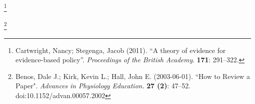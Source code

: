 \documentclass{article}
\begin{document}
    \pagestyle{fancy}
    \hspace{0pt}
    \vfill

    \begin{center}
    \end{center}

    \hspace{0pt}
    \vfill

    \begin{center}
	\footnote{Cartwright, Nancy; Stegenga, Jacob (2011). ``A theory of evidence for evidence-based policy''. {\it Proceedings of the British Academy}. {\bfseries 171}: 291--322.}
    \end{center}
    
    \hspace{0pt}
    \vfill
    
    \begin{center}
    \end{center}

    \hspace{0pt}
    \vfill

    \begin{center}
	\footnote{Benos, Dale J.; Kirk, Kevin L.; Hall, John E. (2003-06-01). ``How to Review a Paper". {\it Advances in Physiology Education.} {\bfseries 27 (2)}: 47--52. doi:10.1152/advan.00057.2002}
    \end{center}
    
    \hspace{0pt}
    \vfill
\end{document}
